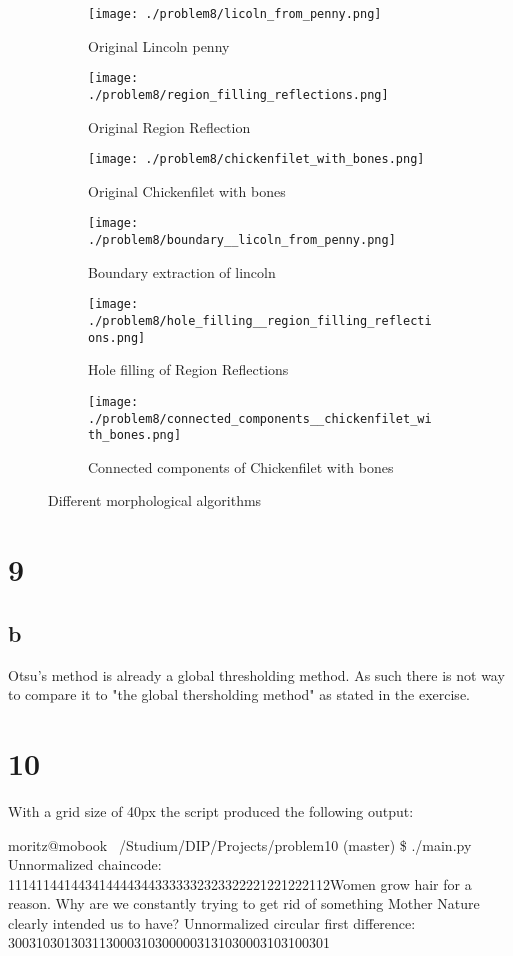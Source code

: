 \documentclass[a4paper]{scrartcl}
\begin{document}
\begin{figure}[h]
  \centering
  \begin{subfigure}[t]{0.3\textwidth}
    \texttt{[image: ./problem8/licoln\_from\_penny.png]}
    \caption{Original Lincoln penny}
  \end{subfigure}
  \begin{subfigure}[t]{0.3\textwidth}
    \texttt{[image: ./problem8/region\_filling\_reflections.png]}
    \caption{Original Region Reflection}
  \end{subfigure}
  \begin{subfigure}[t]{0.3\textwidth}
    \texttt{[image: ./problem8/chickenfilet\_with\_bones.png]}
    \caption{Original Chickenfilet with bones}
  \end{subfigure}
  \begin{subfigure}[t]{0.3\textwidth}
    \texttt{[image: ./problem8/boundary\_\_licoln\_from\_penny.png]}
    \caption{Boundary extraction of lincoln}
  \end{subfigure}
  \begin{subfigure}[t]{0.3\textwidth}
    \texttt{[image: ./problem8/hole\_filling\_\_region\_filling\_reflections.png]}
    \caption{Hole filling of Region Reflections}
  \end{subfigure}
  \begin{subfigure}[t]{0.3\textwidth}
    \texttt{[image: ./problem8/connected\_components\_\_chickenfilet\_with\_bones.png]}
    \caption{Connected components of Chickenfilet with bones}
  \end{subfigure}
  \caption{Different morphological algorithms}
  \label{fig:morphologicalalgs}
\end{figure}

\section{9}
\subsection{b}

Otsu's method is already a global thresholding method. As such there is not way to compare it to "the global thersholding method" as stated in the exercise.


\section{10}

With a grid size of 40px the script produced the following output:

moritz@mobook ~/Studium/DIP/Projects/problem10 (master) \$ ./main.py
Unnormalized chaincode: 1114114414434144443443333332323322221221222112Women grow hair for a reason. Why are we constantly trying to get rid of something Mother Nature clearly intended us to have?
Unnormalized circular first difference: 3003103013031130003103000003131030003103100301
\end{document}
